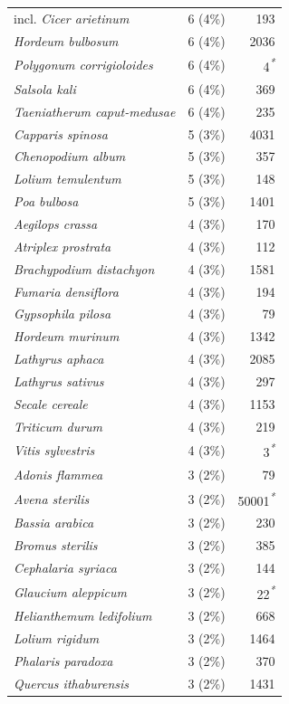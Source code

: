 \documentclass[
  number,
  review]{elsarticle}
\begin{document}
\begin{table}
{\begin{tabular*}{\linewidth}{@{\extracolsep{\fill}}lrr}
incl. \emph{Cicer arietinum} & 6 (4\%) & 193 \\ 
\emph{Hordeum bulbosum} & 6 (4\%) & 2036 \\ 
\emph{Polygonum corrigioloides} & 6 (4\%) & 4\textsuperscript{\textit{*}} \\ 
\emph{Salsola kali} & 6 (4\%) & 369 \\ 
\emph{Taeniatherum caput-medusae} & 6 (4\%) & 235 \\ 
\emph{Capparis spinosa} & 5 (3\%) & 4031 \\ 
\emph{Chenopodium album} & 5 (3\%) & 357 \\ 
\emph{Lolium temulentum} & 5 (3\%) & 148 \\ 
\emph{Poa bulbosa} & 5 (3\%) & 1401 \\ 
\emph{Aegilops crassa} & 4 (3\%) & 170 \\ 
\emph{Atriplex prostrata} & 4 (3\%) & 112 \\ 
\emph{Brachypodium distachyon} & 4 (3\%) & 1581 \\ 
\emph{Fumaria densiflora} & 4 (3\%) & 194 \\ 
\emph{Gypsophila pilosa} & 4 (3\%) & 79 \\ 
\emph{Hordeum murinum} & 4 (3\%) & 1342 \\ 
\emph{Lathyrus aphaca} & 4 (3\%) & 2085 \\ 
\emph{Lathyrus sativus} & 4 (3\%) & 297 \\ 
\emph{Secale cereale} & 4 (3\%) & 1153 \\ 
\emph{Triticum durum} & 4 (3\%) & 219 \\ 
\emph{Vitis sylvestris} & 4 (3\%) & 3\textsuperscript{\textit{*}} \\ 
\emph{Adonis flammea} & 3 (2\%) & 79 \\ 
\emph{Avena sterilis} & 3 (2\%) & 50001\textsuperscript{\textit{*}} \\ 
\emph{Bassia arabica} & 3 (2\%) & 230 \\ 
\emph{Bromus sterilis} & 3 (2\%) & 385 \\ 
\emph{Cephalaria syriaca} & 3 (2\%) & 144 \\ 
\emph{Glaucium aleppicum} & 3 (2\%) & 22\textsuperscript{\textit{*}} \\ 
\emph{Helianthemum ledifolium} & 3 (2\%) & 668 \\ 
\emph{Lolium rigidum} & 3 (2\%) & 1464 \\ 
\emph{Phalaris paradoxa} & 3 (2\%) & 370 \\ 
\emph{Quercus ithaburensis} & 3 (2\%) & 1431 \\ 

\end{tabular*}}
\end{table}
\end{document}

